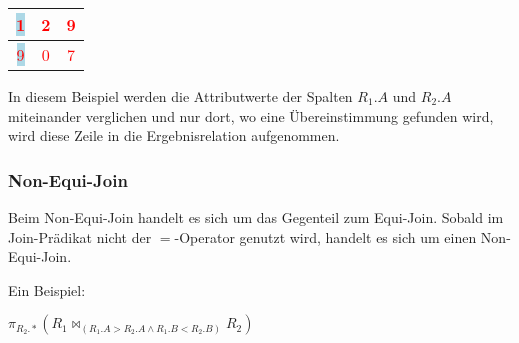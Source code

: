 \begin{center}
\begin{small}
            \begin{minipage}[b]{.3\linewidth}
              \begin{center}
                \tabletail{
                  \hline
                }
                \tablelasttail{
                  \hline
                }
                \begin{supertabular}{|c|c|c|}
                  \colorbox{lightblue}{\textcolor{red}{1}} & \textcolor{red}{2} & \textcolor{red}{9} \\
                  \hline
                  \colorbox{lightblue}{\textcolor{red}{9}} & \textcolor{red}{0} & \textcolor{red}{7} \\
                \end{supertabular}
              \end{center}
            \end{minipage}
          \end{small}
        \end{center}
        In diesem Beispiel werden die Attributwerte der Spalten $R_1.A$ und $R_2.A$ miteinander verglichen und nur dort, wo eine Übereinstimmung gefunden wird, wird diese Zeile in die Ergebnisrelation aufgenommen.
      \subsubsection{Non-Equi-Join}
        Beim Non-Equi-Join handelt es sich um das Gegenteil zum Equi-Join. Sobald im Join-Prädikat nicht der $=$-Operator genutzt wird, handelt es sich um einen Non-Equi-Join.

        Ein Beispiel:

        $\pi _{R_2.*}(R_1\bowtie _{(R_1.A > R_2.A\wedge R_1.B < R_2.B)} R_2)$

